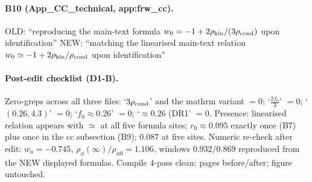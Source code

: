 \paragraph{B10 (App\_CC\_technical, app:frw\_cc).}
OLD: ``reproducing the main-text formula
$w_0=-1+2\rho_{\rm kin}/(3\rho_{\rm cond})$ upon
identification''
NEW: ``matching the linearised main-text relation
$w_0\simeq-1+2\rho_{\rm kin}/\rho_{\rm cond}$ upon
identification''

\paragraph{Post-edit checklist (D1-B).}
Zero-greps across all three files: `$3\rho_{\rm cond}$' and the
mathrm variant $=0$; `$\frac{2f_0}{3}$' $=0$; `$(0.26,4.3)$'
$=0$; `$f_0 \approx 0.26$' $=0$; `$\approx 0.26$ (DR1' $=0$.
Presence: linearised relation appears with $\simeq$ at all five
formula sites; $r_0\approx0.095$ exactly once (B7) plus once in
the cc subsection (B9); $0.087$ at five sites. Numeric re-check
after edit: $w_a=-0.745$, $\rho_\phi(\infty)/\rho_{\phi0}=1.106$,
windows $0.932/0.869$ reproduced from the NEW displayed formulas.
Compile 4-pass clean; pages before/after; figure untouched.
